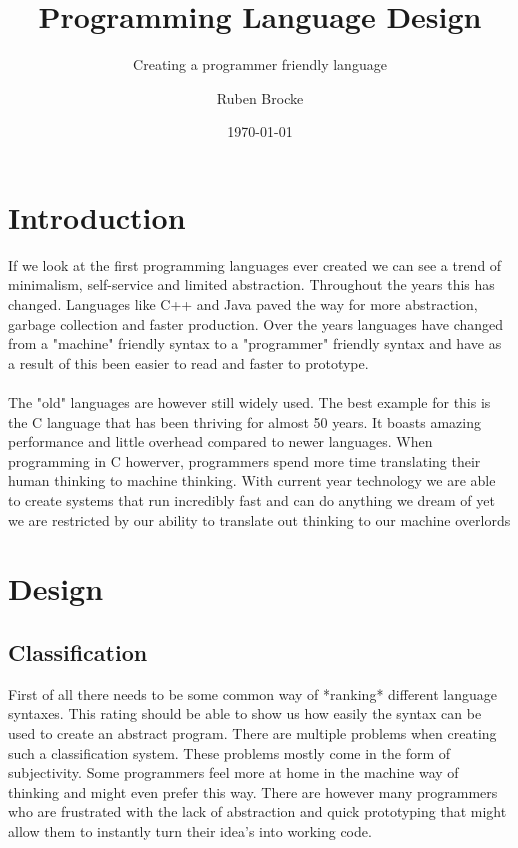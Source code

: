 \documentclass{scrartcl}
\author{Ruben Brocke}
\title{Programming Language Design}
\subtitle{Creating a programmer friendly language}
\date{\today}
\begin{document}
    \pagecolor{yellow!10}
    \begin{titlepage}
        \clearpage
        \maketitle
        \thispagestyle{empty}
    \end{titlepage}
    \newpage

    \tableofcontents
    \newpage

    \section{Introduction}
    If we look at the first programming languages ever created
    we can see a trend of minimalism, self-service and limited abstraction.
    Throughout the years this has changed. Languages like C++ and Java
    paved the way for more abstraction, garbage collection and faster production.
    Over the years languages have changed from a "machine" friendly syntax
    to a "programmer" friendly syntax and have as a result of this been
    easier to read and faster to prototype.
    \paragraph{}
    The "old" languages are however still widely used. The best example for
    this is the C language that has been thriving for almost 50 years. 
    It boasts amazing performance and little overhead compared to newer languages.
    When programming in C howerver, programmers spend more time translating their
    human thinking to machine thinking. With current year technology we are
    able to create systems that run incredibly fast and can do anything we dream of
    yet we are restricted by our ability to translate out thinking to our machine overlords
    \newpage

    \section{Design}
    \subsection{Classification}
    First of all there needs to be some common way of *ranking* different 
    language syntaxes. This rating should be able to show us how easily 
    the syntax can be used to create an abstract program. There are multiple
    problems when creating such a classification system. These problems mostly
    come in the form of subjectivity. Some programmers feel more at home in
    the machine way of thinking and might even prefer this way. There are however
    many programmers who are frustrated with the lack of abstraction and quick
    prototyping that might allow them to instantly turn their idea's into working code.
\end{document}
